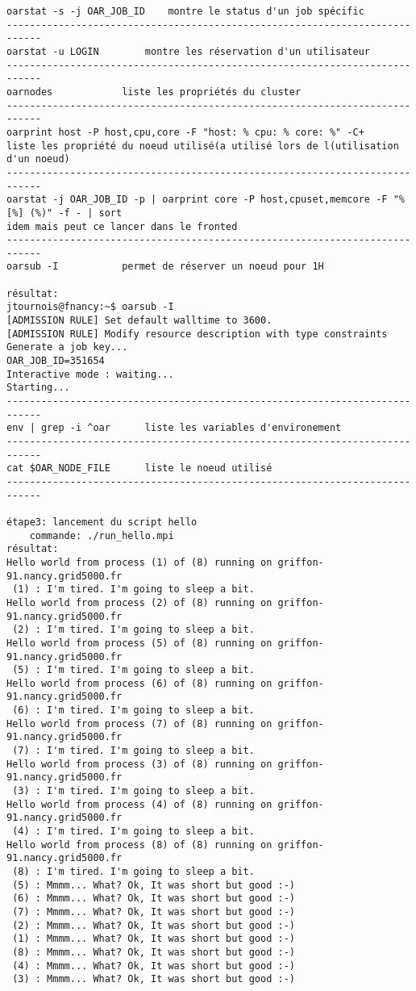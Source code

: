 \begin{lstlisting}
oarstat -s -j OAR_JOB_ID	montre le status d'un job spécific
----------------------------------------------------------------------------
oarstat -u LOGIN		montre les réservation d'un utilisateur
----------------------------------------------------------------------------
oarnodes			liste les propriétés du cluster
----------------------------------------------------------------------------
oarprint host -P host,cpu,core -F "host: % cpu: % core: %" -C+			
liste les propriété du noeud utilisé(a utilisé lors de l(utilisation d'un noeud)
----------------------------------------------------------------------------
oarstat -j OAR_JOB_ID -p | oarprint core -P host,cpuset,memcore -F "%[%] (%)" -f - | sort
idem mais peut ce lancer dans le fronted
----------------------------------------------------------------------------
oarsub -I			permet de réserver un noeud pour 1H

résultat:
jtournois@fnancy:~$ oarsub -I
[ADMISSION RULE] Set default walltime to 3600.
[ADMISSION RULE] Modify resource description with type constraints
Generate a job key...
OAR_JOB_ID=351654
Interactive mode : waiting...
Starting...
----------------------------------------------------------------------------
env | grep -i ^oar		liste les variables d'environement
----------------------------------------------------------------------------
cat $OAR_NODE_FILE		liste le noeud utilisé
----------------------------------------------------------------------------

étape3: lancement du script hello
	commande: ./run_hello.mpi
résultat:
Hello world from process (1) of (8) running on griffon-91.nancy.grid5000.fr
 (1) : I'm tired. I'm going to sleep a bit.
Hello world from process (2) of (8) running on griffon-91.nancy.grid5000.fr
 (2) : I'm tired. I'm going to sleep a bit.
Hello world from process (5) of (8) running on griffon-91.nancy.grid5000.fr
 (5) : I'm tired. I'm going to sleep a bit.
Hello world from process (6) of (8) running on griffon-91.nancy.grid5000.fr
 (6) : I'm tired. I'm going to sleep a bit.
Hello world from process (7) of (8) running on griffon-91.nancy.grid5000.fr
 (7) : I'm tired. I'm going to sleep a bit.
Hello world from process (3) of (8) running on griffon-91.nancy.grid5000.fr
 (3) : I'm tired. I'm going to sleep a bit.
Hello world from process (4) of (8) running on griffon-91.nancy.grid5000.fr
 (4) : I'm tired. I'm going to sleep a bit.
Hello world from process (8) of (8) running on griffon-91.nancy.grid5000.fr
 (8) : I'm tired. I'm going to sleep a bit.
 (5) : Mmmm... What? Ok, It was short but good :-)
 (6) : Mmmm... What? Ok, It was short but good :-)
 (7) : Mmmm... What? Ok, It was short but good :-)
 (2) : Mmmm... What? Ok, It was short but good :-)
 (1) : Mmmm... What? Ok, It was short but good :-)
 (8) : Mmmm... What? Ok, It was short but good :-)
 (4) : Mmmm... What? Ok, It was short but good :-)
 (3) : Mmmm... What? Ok, It was short but good :-)


\end{lstlisting}
